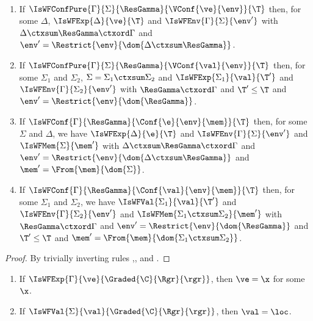 \begin{lemma}\label{lem:inversionConf}\ 
\begin{enumerate}
\item\label{lem:inversionConf:pure:ve} If $\IsWFConfPure{\Gamma}{\Sigma}{\ResGamma}{\VConf{\ve}{\env}}{\T}$ then, for some $\Delta$,
$\IsWFExp{\Delta}{\ve}{\T}$ and $\IsWFEnv{\Gamma}{\Sigma}{\env'}$ with $\Delta\ctxsum\ResGamma\ctxord\Gamma$ and $\env'=\Restrict{\env}{\dom{\Delta\ctxsum\ResGamma}}$.
%
%
\item\label{lem:inversionConf:pure:res} If $\IsWFConfPure{\Gamma}{\Sigma}{\ResGamma}{\VConf{\val}{\env}}{\T}$ then, for some $\Sigma_1$ and $\Sigma_2$, $\Sigma=\Sigma_1\ctxsum\Sigma_2$ and
$\IsWFExp{\Sigma_1}{\val}{\T'}$ and $\IsWFEnv{\Gamma}{\Sigma_2}{\env'}$ with $\ResGamma\ctxord\Gamma$ and $\T'\leq\T$ and $\env'=\Restrict{\env}{\dom{\ResGamma}}$.
%
%
\item\label{lem:inversionConf:exp:e} If $\IsWFConf{\Gamma}{\ResGamma}{\Conf{\e}{\env}{\mem}}{\T}$ then, for some $\Sigma$ and $\Delta$, we have $\IsWFExp{\Delta}{\e}{\T}$ and 
$\IsWFEnv{\Gamma}{\Sigma}{\env'}$ and $\IsWFMem{\Sigma}{\mem'}$ with $\Delta\ctxsum\ResGamma\ctxord\Gamma$ and
 $\env'=\Restrict{\env}{\dom{\Delta\ctxsum\ResGamma}}$  and  $\mem'=\From{\mem}{\dom{\Sigma}}$.
%
%
\item\label{lem:inversionConf:exp:res} If $\IsWFConf{\Gamma}{\ResGamma}{\Conf{\val}{\env}{\mem}}{\T}$ then, for some $\Sigma_1$ and $\Sigma_2$, we have $\IsWFVal{\Sigma_1}{\val}{\T'}$ and 
$\IsWFEnv{\Gamma}{\Sigma_2}{\env'}$ and $\IsWFMem{\Sigma_1\ctxsum\Sigma_2}{\mem'}$ with $\ResGamma\ctxord\Gamma$
and $\env'=\Restrict{\env}{\dom{\ResGamma}}$ and $\T'\leq\T$ and $\mem'=\From{\mem}{\dom{\Sigma_1\ctxsum\Sigma_2}}$.
\end{enumerate}
\end{lemma}
\begin{proof}
By trivially inverting rules ,, and .
\end{proof}


\begin{lemma}\label{lem:canonical}
\begin{enumerate}
\item \label{lem:canonical:ve:x} If $\IsWFExp{\Gamma}{\ve}{\Graded{\C}{\Rgr}{\rgr}}$, then $\ve=\x$ for some $\x$.
\item \label{lem:canonical:val:loc} If  $\IsWFVal{\Sigma}{\val}{\Graded{\C}{\Rgr}{\rgr}}$, then $\val=\loc$.
\end{enumerate}
\end{lemma}


